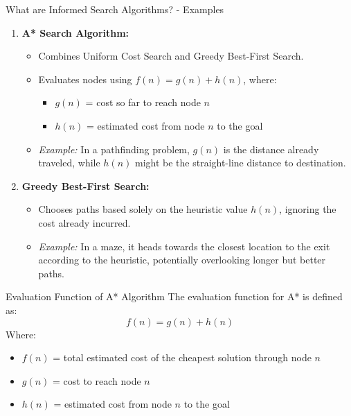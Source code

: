 \documentclass[aspectratio=169]{beamer}
\begin{document}
\begin{frame}[fragile]{What are Informed Search Algorithms? - Examples}
    \begin{enumerate}
        \item \textbf{A* Search Algorithm:}
        \begin{itemize}
            \item Combines Uniform Cost Search and Greedy Best-First Search.
            \item Evaluates nodes using \( f(n) = g(n) + h(n) \), where:
                \begin{itemize}
                    \item \( g(n) \) = cost so far to reach node \( n \)
                    \item \( h(n) \) = estimated cost from node \( n \) to the goal
                \end{itemize}
            \item \textit{Example:} In a pathfinding problem, \( g(n) \) is the distance already traveled, while \( h(n) \) might be the straight-line distance to destination.
        \end{itemize}
        
        \item \textbf{Greedy Best-First Search:}
        \begin{itemize}
            \item Chooses paths based solely on the heuristic value \( h(n) \), ignoring the cost already incurred.
            \item \textit{Example:} In a maze, it heads towards the closest location to the exit according to the heuristic, potentially overlooking longer but better paths.
        \end{itemize}
    \end{enumerate}
\end{frame}

\begin{frame}[fragile]{Evaluation Function of A* Algorithm}
    The evaluation function for A* is defined as:
    \begin{equation}
        f(n) = g(n) + h(n)
    \end{equation}
    Where:
    \begin{itemize}
        \item \( f(n) \) = total estimated cost of the cheapest solution through node \( n \)
        \item \( g(n) \) = cost to reach node \( n \)
        \item \( h(n) \) = estimated cost from node \( n \) to the goal
    \end{itemize}
\end{frame}
\end{document}
